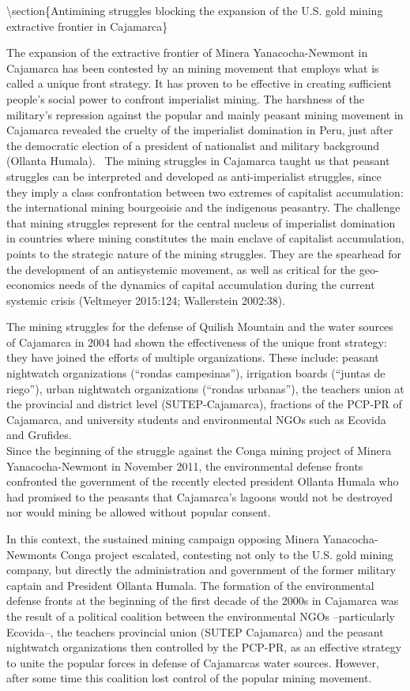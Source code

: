 \documentclass[
]{article}
\begin{document}
\textbackslash section\{Antimining struggles blocking the expansion of
the U.S. gold mining extractive frontier in Cajamarca\}

The expansion of the extractive frontier of Minera Yanacocha-Newmont in
Cajamarca has been contested by an mining movement that employs what is
called a unique front strategy. It has proven to be effective in
creating sufficient people's social power to confront imperialist
mining. The harshness of the military's repression against the popular
and mainly peasant mining movement in Cajamarca revealed the cruelty of
the imperialist domination in Peru, just after the democratic election
of a president of nationalist and military background (Ollanta Humala).~
The mining struggles in Cajamarca taught us that peasant struggles can
be interpreted and developed as anti-imperialist struggles, since they
imply a class confrontation between two extremes of capitalist
accumulation: the international mining bourgeoisie and the indigenous
peasantry. The challenge that mining struggles represent for the central
nucleus of imperialist domination in countries where mining constitutes
the main enclave of capitalist accumulation, points to the strategic
nature of the mining struggles. They are the spearhead for the
development of an antisystemic movement, as well as critical for the
geo-economics needs of the dynamics of capital accumulation during the
current systemic crisis (Veltmeyer 2015:124; Wallerstein 2002:38).

The mining struggles for the defense of Quilish Mountain and the water
sources of Cajamarca in 2004 had shown the effectiveness of the unique
front strategy: they have joined the efforts of multiple organizations.
These include: peasant nightwatch organizations (``rondas campesinas''),
irrigation boards (``juntas de riego''), urban nightwatch organizations
(``rondas urbanas''), the teachers union at the provincial and district
level (SUTEP-Cajamarca), fractions of the PCP-PR of Cajamarca, and
university students and environmental NGOs such as Ecovida and
Grufides.\\
Since the beginning of the struggle against the Conga mining project of
Minera Yanacocha-Newmont in November 2011, the environmental defense
fronts confronted the government of the recently elected president
Ollanta Humala who had promised to the peasants that Cajamarca's lagoons
would not be destroyed nor would mining be allowed without popular
consent.

In this context, the sustained mining campaign opposing Minera
Yanacocha-Newmont\textquotesingle s Conga project escalated, contesting
not only to the U.S. gold mining company, but directly the
administration and government of the former military captain and
President Ollanta Humala. The formation of the environmental defense
fronts at the beginning of the first decade of the 2000s in Cajamarca
was the result of a political coalition between the environmental NGOs
--particularly Ecovida--, the teachers provincial union (SUTEP
Cajamarca) and the peasant nightwatch organizations then controlled by
the PCP-PR, as an effective strategy to unite the popular forces in
defense of Cajamarca\textquotesingle s water sources. However, after
some time this coalition lost control of the popular mining movement.
\end{document}

